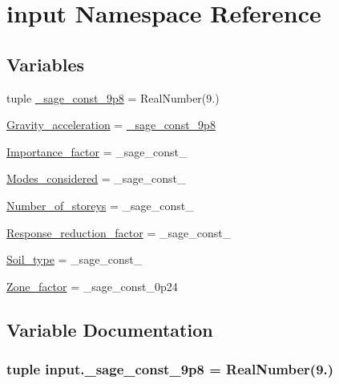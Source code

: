 \hypertarget{a00038}{}\section{input Namespace Reference}
\label{a00038}
\subsection*{Variables}
\begin{DoxyCompactItemize}
\item 
tuple \hyperlink{a00038_ac1b86705df1981fd4962cc056fb0608a}{\+\_\+sage\+\_\+const\+\_\+9p8} = Real\+Number(\textquotesingle{}9.\textquotesingle{})
\item 
\hyperlink{a00038_a55ab15c1c171513e99332aa50c723764}{Gravity\+\_\+acceleration} = \hyperlink{a00038_ac1b86705df1981fd4962cc056fb0608a}{\+\_\+sage\+\_\+const\+\_\+9p8}
\item 
\hyperlink{a00038_a0840d963ea24db338f3ab4457defb494}{Importance\+\_\+factor} = \+\_\+sage\+\_\+const\+\_
\item 
\hyperlink{a00038_adb7aca4735796aaa4a46456d3edeac2e}{Modes\+\_\+considered} = \+\_\+sage\+\_\+const\+\_
\item 
\hyperlink{a00038_a10237b312ba44e8c8090db86059c5803}{Number\+\_\+of\+\_\+storeys} = \+\_\+sage\+\_\+const\+\_
\item 
\hyperlink{a00038_aa6d0078a6d934c0d515d85059525e938}{Response\+\_\+reduction\+\_\+factor} = \+\_\+sage\+\_\+const\+\_
\item 
\hyperlink{a00038_a6221ae01cf2fb9e8cd22204749785a0e}{Soil\+\_\+type} = \+\_\+sage\+\_\+const\+\_
\item 
\hyperlink{a00038_aeea70e58ec9bb0d3d6c4363867eb0f82}{Zone\+\_\+factor} = \+\_\+sage\+\_\+const\+\_\+0p24
\end{DoxyCompactItemize}


\subsection{Variable Documentation}
\hypertarget{a00038_ac1b86705df1981fd4962cc056fb0608a}{}
\subsubsection[{\+\_\+sage\+\_\+const\+\_\+9p8}]{\setlength{\rightskip}{0pt plus 5cm}tuple input.\+\_\+sage\+\_\+const\+\_\+9p8 = Real\+Number(\textquotesingle{}9.\textquotesingle{})}\label{a00038_ac1b86705df1981fd4962cc056fb0608a}


